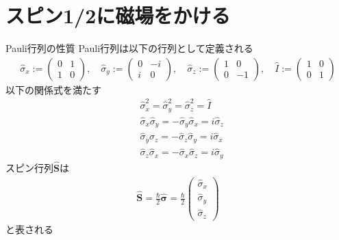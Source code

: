 \documentclass{jsarticle}  %
\numberwithin{equation}{section} %
\numberwithin{figure}{section}
\begin{document}
\section{スピン1/2に磁場をかける}
    \begin{itembox}[l]{\large{Pauli行列の性質}}
        Pauli行列は以下の行列として定義される
        \begin{align}
            \hat{\sigma}_x := 
            \left(
            \begin{matrix}
                0&1\\
                1&0
            \end{matrix}
            \right),\quad
            \hat{\sigma}_y := 
            \left(
            \begin{matrix}
                0&-i\\
                i&0
            \end{matrix}
            \right),\quad
            \hat{\sigma}_z := 
            \left(
            \begin{matrix}
                1&0\\
                0&-1
            \end{matrix}
            \right),\quad
            \hat{I} := 
            \left(
            \begin{matrix}
                1&0\\
                0&1
            \end{matrix}
            \right) 
        \end{align}
        以下の関係式を満たす
        \begin{align}
            &\hat{\sigma}_x^2 = \hat{\sigma}_y^2 = \hat{\sigma}_z^2 = \hat{I} \\
            &\hat{\sigma}_x \hat{\sigma}_y = -\hat{\sigma}_y \hat{\sigma}_x = i\hat{\sigma}_z \\
            &\hat{\sigma}_y \hat{\sigma}_z = -\hat{\sigma}_z \hat{\sigma}_y = i\hat{\sigma}_x \\
            &\hat{\sigma}_z \hat{\sigma}_x = -\hat{\sigma}_x \hat{\sigma}_z = i\hat{\sigma}_y
        \end{align}
        スピン行列$\hat{\bm{S}}$は
        \begin{align}
            \hat{\bm{S}} = \frac{\hbar}{2} \hat{\bm{\sigma}}= \frac{\hbar}{2} 
            \left(
            \begin{matrix}
                \hat{\sigma}_x\\
                \hat{\sigma}_y\\
                \hat{\sigma}_z
            \end{matrix}
            \right)
        \end{align}
        と表される
    \end{itembox}
\end{document}
